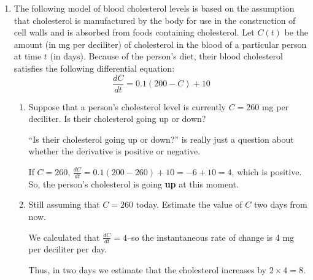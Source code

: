 \documentclass{article}
\begin{document}
\begin{enumerate}
\begin{enumerate}
\begin{solution}
\begin{enumerate}[label=\roman*.]
     
    \end{enumerate}
  \end{solution}
  
 
 
\end{enumerate}


\item{}
    The following model of blood cholesterol levels is based on the assumption
    that cholesterol is manufactured by the body for use in the
    construction of cell walls and is absorbed from foods containing
    cholesterol.  Let $C(t)$ be the amount (in mg per deciliter) of
    cholesterol in the blood of a particular person at time $t$ (in days).
    Because of the person's diet, their blood cholesterol satisfies the
    following differential equation:
    \[ \frac{dC}{dt} = 0.1 (200 - C) + 10 \] 

    \begin{enumerate}
        \item \begin{problem}[\vfill] Suppose that a person's cholesterol level is currently $C = 260$ mg per deciliter. Is their cholesterol going up or down? \end{problem}
        
      \begin{solution}
    ``Is their cholesterol going up or down?'' is really just a question about whether the derivative is positive or negative. 

    If $C = 260$, $\frac{dC}{dt} = 0.1 (200 - 260) + 10 = -6 + 10 = 4$, which is positive. So, the person's cholesterol is going {\bf up} at this moment. 
      \end{solution}
        
        
       

     \item \begin{problem}[\vfill] Still assuming that $C = 260$ today. Estimate the value of $C$ two days from now. 
\end{problem}
     
  \begin{solution}
   We calculated that $\frac{dC}{dt} = 4$--so the instantaneous rate of change is 4 mg per deciliter per day. 

   Thus, in two days we estimate that the cholesterol increases by $2 \times 4 = 8$. 

      \end{solution}
  
    \end{enumerate}

 \end{enumerate}
\end{document}
